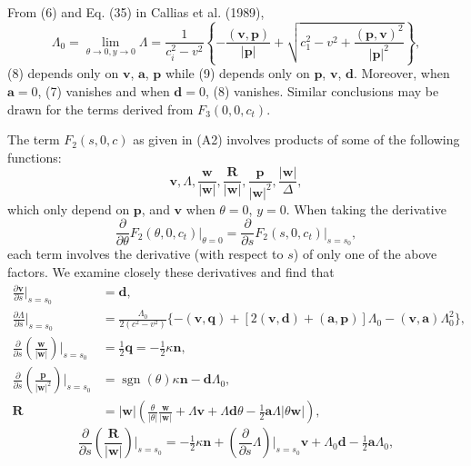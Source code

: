 \documentclass[12pt]{article}
\begin{document}
From (6) and Eq. (35) in Callias et al. (1989),
\[
\Lambda_0 = \lim_{\theta\to 0, y\to 0}\Lambda = \frac{1}{c_i^2-v^2}\left\{-\frac{(\mathbf{v},\mathbf{p})}{|\mathbf{p}|} + \sqrt{c_1^2 - v^2 + \frac{(\mathbf{p},\mathbf{v})^2}{|\mathbf{p}|^2}}\right\},
\]
(8) depends only on $\mathbf{v}$, $\mathbf{a}$, $\mathbf{p}$ while (9) depends only on $\mathbf{p}$, $\mathbf{v}$, $\mathbf{d}$. Moreover, when $\mathbf{a}=0$, (7) vanishes and when $\mathbf{d}=0$, (8) vanishes. Similar conclusions may be drawn for the terms derived from $F_3(0,0,c_t)$.

The term $F_2(s,0,c)$ as given in (A2) involves products of some of the following functions:
\[
\mathbf{v}, \Lambda, \frac{\mathbf{w}}{|\mathbf{w}|}, \frac{\mathbf{R}}{|\mathbf{w}|}, \frac{\mathbf{p}}{|\mathbf{w}|^2}, \frac{|\mathbf{w}|}{\Delta},
\]
which only depend on $\mathbf{p}$, and $\mathbf{v}$ when $\theta=0$, $y=0$. When taking the derivative
\[
\frac{\partial}{\partial\theta}F_2(\theta,0,c_t)\big|_{\theta=0} = \frac{\partial}{\partial s}F_2(s,0,c_t)\big|_{s=s_0},
\]
each term involves the derivative (with respect to $s$) of only one of the above factors. We examine closely these derivatives and find that
\begin{align*}
\frac{\partial\mathbf{v}}{\partial s}\bigg|_{s=s_0} &= \mathbf{d}, \\
\frac{\partial\Lambda}{\partial s}\bigg|_{s=s_0} &= \frac{\Lambda_0}{2(c^2-v^2)}\{-(\mathbf{v},\mathbf{q}) + [2(\mathbf{v},\mathbf{d})+(\mathbf{a},\mathbf{p})]\Lambda_0 - (\mathbf{v},\mathbf{a})\Lambda_0^2\}, \\
\frac{\partial}{\partial s}\left(\frac{\mathbf{w}}{|\mathbf{w}|}\right)\bigg|_{s=s_0} &= \tfrac{1}{2}\mathbf{q} = -\tfrac{1}{2}\kappa\mathbf{n}, \\
\frac{\partial}{\partial s}\left(\frac{\mathbf{p}}{|\mathbf{w}|^2}\right)\bigg|_{s=s_0} &= \operatorname{sgn}(\theta)\kappa\mathbf{n} - \mathbf{d}\Lambda_0, \\
\mathbf{R} &= |\mathbf{w}|\left(\frac{\theta}{|\theta|}\frac{\mathbf{w}}{|\mathbf{w}|} + \Lambda\mathbf{v} + \Lambda\mathbf{d}\theta - \tfrac{1}{2}\mathbf{a}\Lambda|\theta\mathbf{w}|\right),
\end{align*}
\begin{equation}
\frac{\partial}{\partial s}\left(\frac{\mathbf{R}}{|\mathbf{w}|}\right)\bigg|_{s=s_0} = -\tfrac{1}{2}\kappa\mathbf{n} + \left(\frac{\partial}{\partial s}\Lambda\right)\bigg|_{s=s_0}\mathbf{v} + \Lambda_0\mathbf{d} - \tfrac{1}{2}\mathbf{a}\Lambda_0,
\end{equation}
\end{document}

